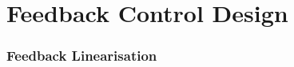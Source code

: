\chapter{Feedback Control Design}
\label{chp:control}


\subsection{Feedback Linearisation}
\label{sec:colocated_linearisation}